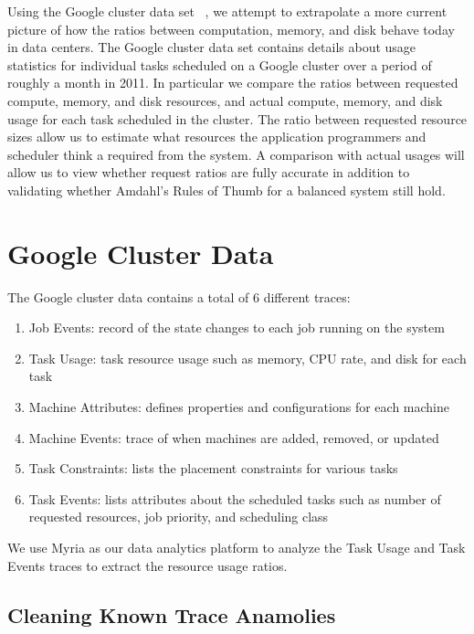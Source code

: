 \documentclass{sig-alternate}
\begin{document}
Using the Google cluster data set ~\cite{clusterdata:Wilkes2011, clusterdata:Reiss2011}, we attempt to extrapolate a more current picture of how the ratios between computation, memory, and disk behave today in data centers.
The Google cluster data set contains details about usage statistics for individual tasks scheduled on a Google cluster over a period of roughly a month in 2011.
In particular we compare the ratios between requested compute, memory, and disk resources, and actual compute, memory, and disk usage for each task scheduled in the cluster.
The ratio between requested resource sizes allow us to estimate what resources the application programmers and scheduler think a required from the system.
A comparison with actual usages will allow us to view whether request ratios are fully accurate in addition to validating whether Amdahl's Rules of Thumb for a balanced system still hold.

\section{Google Cluster Data}

The Google cluster data contains a total of 6 different traces:
\begin{enumerate}
\item Job Events: record of the state changes to each job running on the system
\item Task Usage: task resource usage such as memory, CPU rate, and disk for each task
\item Machine Attributes: defines properties and configurations for each machine
\item Machine Events: trace of when machines are added, removed, or updated
\item Task Constraints: lists the placement constraints for various tasks
\item Task Events: lists attributes about the scheduled tasks such as number of requested resources, job priority, and scheduling class
\end{enumerate}
We use Myria \cite{HalperinACCKMORWWXBHS14SIGMOD} as our data analytics platform to analyze the Task Usage and Task Events traces to extract the resource usage ratios.

\subsection{Cleaning Known Trace Anamolies}
\end{document}
